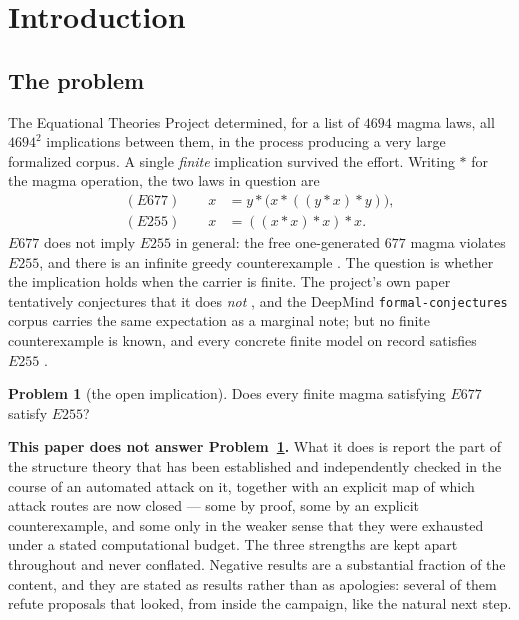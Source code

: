 \documentclass[11pt]{article}
\theoremstyle{plain}
\theoremstyle{definition}
\newtheorem{problem}[theorem]{Problem}
\theoremstyle{remark}
\numberwithin{equation}{section}
\newcommand{\op}{\mathbin{*}}
\begin{document}
\section{Introduction}\label{sec:intro}

\subsection{The problem}

The Equational Theories Project \cite{etp} determined, for a list of $4694$ magma laws, all
$4694^2$ implications between them, in the process producing a very large formalized corpus.
A single \emph{finite} implication survived the effort. Writing $\op$ for the magma
operation, the two laws in question are
\begin{align*}
  (E677) \qquad x &= y \op \bigl(x \op ((y\op x)\op y)\bigr), \\
  (E255) \qquad x &= ((x\op x)\op x)\op x .
\end{align*}
$E677$ does not imply $E255$ in general: the free one-generated $677$ magma violates $E255$,
and there is an infinite greedy counterexample \cite[Ch.~13]{blueprint}. The question is
whether the implication holds when the carrier is finite. The project's own paper
tentatively conjectures that it does \emph{not} \cite{etp}, and the DeepMind
\texttt{formal-conjectures} corpus \cite{formalconjectures} carries the same expectation as
a marginal note; but no finite counterexample is known, and every concrete finite model on
record satisfies $E255$ \cite{icarm}.

\begin{problem}[the open implication]\label{prob:main}
Does every finite magma satisfying $E677$ satisfy $E255$?
\end{problem}

\textbf{This paper does not answer Problem~\ref{prob:main}.} What it does is report the part
of the structure theory that has been established and independently checked in the course of
an automated attack on it, together with an explicit map of which attack routes are now
closed --- some by proof, some by an explicit counterexample, and some only in the weaker
sense that they were exhausted under a stated computational budget. The three strengths are
kept apart throughout and never conflated. Negative results are a substantial fraction of the
content, and they are stated as results rather than as apologies: several of them refute
proposals that looked, from inside the campaign, like the natural next step.
\end{document}
